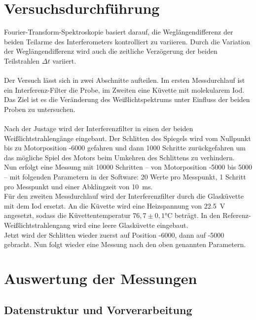 \documentclass[10pt,a4paper]{article}
\begin{document}
\section{Versuchsdurchführung}
Fourier-Transform-Spektroskopie basiert darauf, die Weglängendifferenz der beiden Teilarme des Interferometers kontrolliert zu variieren. Durch die Variation der Weglängendifferenz wird auch die zeitliche Verzögerung der beiden Teilstrahlen $\Delta t$ variiert.\\\\
Der Versuch lässt sich in zwei Abschnitte aufteilen. Im ersten Messdurchlauf ist ein Interferenz-Filter die Probe, im Zweiten eine Küvette mit molekularem Iod. Das Ziel ist es die Veränderung des Weißlichtspektrums unter Einfluss der beiden Proben zu untersuchen.\\\\
Nach der Justage wird der Interferenzfilter in einen der beiden Weißlichtstrahlengänge eingebaut. Der Schlitten des Spiegels wird vom Nullpunkt bis zu Motorposition -6000 gefahren und dann 1000 Schritte zurückgefahren um das mögliche Spiel des Motors beim Umkehren des Schlittens zu verhindern.\\
Nun erfolgt eine Messung mit 10000 Schritten -- von Motorposition -5000 bis 5000 -- mit folgenden Parametern in der Software: 20 Werte pro Messpunkt, 1 Schritt pro Messpunkt und einer Abklingzeit von \qty{10}{ms}.\\
Für den zweiten Messdurchlauf wird der Interferenzfilter durch die Glasküvette mit dem Iod ersetzt. An die Küvette wird eine Heizspannung von \qty{22,5}{V} angesetzt, sodass die Küvettentemperatur $76,7\pm 0,1$°C beträgt. In den Referenz-Weißlichtstrahlengang wird eine leere Glasküvette eingebaut.\\
Jetzt wird der Schlitten wieder zuerst auf Position -6000, dann auf -5000 gebracht. Nun folgt wieder eine Messung nach den oben genannten Parametern.

\section{Auswertung der Messungen}

\subsection{Datenstruktur und Vorverarbeitung}
\end{document}
